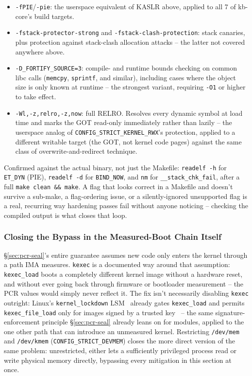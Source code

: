 \documentclass[11pt,a4paper]{article}
\begin{document}
\begin{itemize}
  \item \texttt{-fPIE}/\texttt{-pie}: the userspace equivalent of
    KASLR above, applied to all 7 of kb-core's build targets.
  \item \texttt{-fstack-protector-strong} and
    \texttt{-fstack-clash-protection}: stack canaries, plus protection
    against stack-clash allocation attacks -- the latter not covered
    anywhere above.
  \item \texttt{-D\_FORTIFY\_SOURCE=3}: compile- and runtime bounds
    checking on common libc calls (\texttt{memcpy}, \texttt{sprintf},
    and similar), including cases where the object size is only known
    at runtime -- the strongest variant, requiring \texttt{-O1} or
    higher to take effect.
  \item \texttt{-Wl,-z,relro,-z,now}: full RELRO. Resolves every
    dynamic symbol at load time and marks the GOT read-only
    immediately rather than lazily -- the userspace analog of
    \texttt{CONFIG\_STRICT\_KERNEL\_RWX}'s protection, applied to a
    different writable target (the GOT, not kernel code pages)
    against the same class of overwrite-and-redirect technique.
\end{itemize}

Confirmed against the actual binary, not just the Makefile:
\texttt{readelf -h} for \texttt{ET\_DYN} (PIE), \texttt{readelf -d}
for \texttt{BIND\_NOW}, and \texttt{nm} for
\texttt{\_\_stack\_chk\_fail}, after a full \texttt{make clean \&\&
make}. A flag that looks correct in a Makefile and doesn't survive a
sub-make, a flag-ordering issue, or a silently-ignored unsupported
flag is a real, recurring way hardening passes fail without anyone
noticing -- checking the compiled output is what closes that loop.

\subsubsection{Closing the Bypass in the Measured-Boot Chain Itself}

\S\ref{sec:pcr-seal}'s entire guarantee assumes new code only enters
the kernel through a path IMA measures. \texttt{kexec} is a
documented way around that assumption: \texttt{kexec\_load} boots a
completely different kernel image without a hardware reset, and
without ever going back through firmware or bootloader measurement --
the PCR values would simply never reflect it. The fix isn't
necessarily disabling \texttt{kexec} outright: Linux's
\texttt{kernel\_lockdown} LSM~\cite{kernellockdown} already gates \texttt{kexec\_load} and
permits \texttt{kexec\_file\_load} only for images signed by a trusted
key~\cite{kernelmodsig} -- the same signature-enforcement principle
\S\ref{sec:pcr-seal} already leans on for modules, applied to the one
other path that can introduce an unmeasured kernel. Restricting
\texttt{/dev/mem} and \texttt{/dev/kmem} (\texttt{CONFIG\_STRICT\_DEVMEM})
closes the more direct version of the same problem: unrestricted, either
lets a sufficiently privileged process read or write physical memory
directly, bypassing every mitigation in this section at once.
\end{document}
